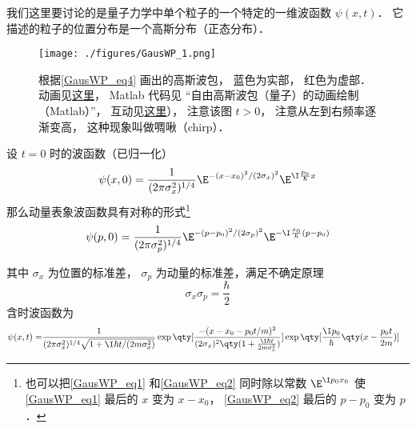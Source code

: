 
\begin{issues}
\issueAbstract
\issueTODO
\end{issues}



我们这里要讨论的是量子力学中单个粒子的一个特定的一维波函数 $\psi(x,t)$． 它描述的粒子的位置分布是一个高斯分布（正态分布）．

\begin{figure}[ht]
\centering
\texttt{[image: ./figures/GausWP\_1.png]}
\caption{根据\autoref{GausWP_eq4} 画出的高斯波包， 蓝色为实部， 红色为虚部． 动画见\href{https://wuli.wiki/apps/free_gauss.html}{这里}， Matlab 代码见 “自由高斯波包（量子）的动画绘制（Matlab）”， 互动见\href{https://wuli.wiki/apps/gausWP.html}{这里}）， 注意该图 $t > 0$， 注意从左到右频率逐渐变高， 这种现象叫做啁啾（chirp）．} \label{GausWP_fig1}
\end{figure}


设 $t = 0$ 时的波函数（已归一化）
\begin{equation}\label{GausWP_eq1}
\psi (x,0) = \frac{1}{(2\pi\sigma_x ^2)^{1/4}} \E^{-(x - x_0)^2/(2\sigma_x)^2} \E^{\I \frac{p_0}{\hbar}x}
\end{equation}
那么动量表象波函数具有对称的形式\footnote{也可以把\autoref{GausWP_eq1} 和\autoref{GausWP_eq2} 同时除以常数 $\E^{\I p_0 x_0}$ 使\autoref{GausWP_eq1} 最后的 $x$ 变为 $x-x_0$， \autoref{GausWP_eq2} 最后的 $p-p_0$ 变为 $p$． }%
\begin{equation}\label{GausWP_eq2} %
\psi (p,0) = \frac{1}{(2\pi\sigma_p^2)^{1/4}} \E^{-(p - p_0)^2/(2\sigma_p)^2} \E^{-\I\frac{x_0}{\hbar }(p - p_0)}
\end{equation}

其中 $\sigma_x$ 为位置的标准差， $\sigma_p$ 为动量的标准差，满足不确定原理
\begin{equation} %
\sigma_x\sigma_p = \frac{\hbar}{2}
\end{equation}
含时波函数为
\begin{equation}\label{GausWP_eq4}\begin{aligned} %
\psi (x,t) = &\frac{1}{(2\pi\sigma_x^2)^{1/4} \sqrt{1 + {\I\hbar t}/(2m \sigma_x^2)}}
\exp\qty[\frac{-(x - x_0 - p_0 t/m)^2}{(2\sigma_x )^2 \qty(1 + \frac{\I\hbar t}{2m \sigma_x^2})}] \exp\qty[\frac{\I p_0}{\hbar } \qty(x - \frac{p_0 t}{2m})]
\end{aligned}\end{equation}

